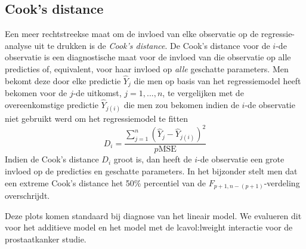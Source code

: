 \documentclass[12pt,dutch,coursenotes]{book}
\theoremstyle{definition}
\theoremstyle{definition}
\theoremstyle{definition}
\theoremstyle{remark}
\begin{document}
\subsection{Cook's distance}\label{cooks-distance}

Een meer rechtstreekse maat om de invloed van elke observatie op de
regressie-analyse uit te drukken is de \emph{Cook's distance}. De Cook's
distance voor de \(i\)-de observatie is een diagnostische maat voor de
invloed van die observatie op alle predicties of, equivalent, voor haar
invloed op \emph{alle} geschatte parameters. Men bekomt deze door elke
predictie \(\hat{Y}_j\) die men op basis van het regressiemodel heeft
bekomen voor de \(j\)-de uitkomst, \(j=1,...,n\), te vergelijken met de
overeenkomstige predictie \(\hat{Y}_{j(i)}\) die men zou bekomen indien
de \(i\)-de observatie niet gebruikt werd om het regressiemodel te
fitten
\[D_i=\frac{\sum_{j=1}^n(\hat{Y}_j-\hat{Y}_{j(i)})^2}{p\textrm{MSE}}\]
Indien de Cook's distance \(D_i\) groot is, dan heeft de \(i\)-de
observatie een grote invloed op de predicties en geschatte parameters.
In het bijzonder stelt men dat een extreme Cook's distance het 50\%
percentiel van de \(F_{p+1,n-(p+1)}\)-verdeling overschrijdt.

Deze plots komen standaard bij diagnose van het lineair model. We
evalueren dit voor het additieve model en het model met de
lcavol:lweight interactie voor de prostaatkanker studie.
\end{document}
